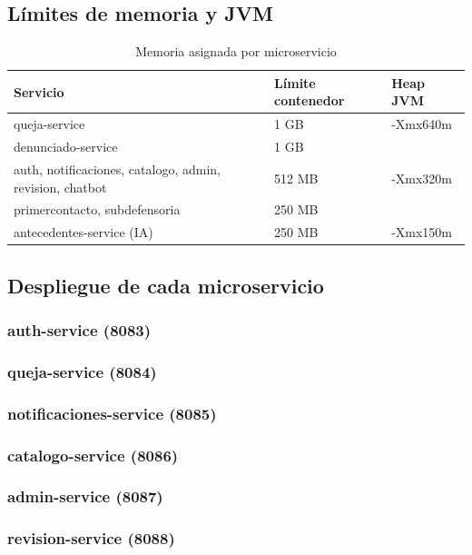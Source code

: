 \subsection{Límites de memoria y JVM}
\begin{table}[H]
\centering
\caption{Memoria asignada por microservicio}
\begin{tabular}{lll}
\toprule
\textbf{Servicio} & \textbf{Límite contenedor} & \textbf{Heap JVM} \\
\midrule
queja-service & 1 GB & -Xmx640m \\
denunciado-service & 1 GB & \pendiente{} \\
auth, notificaciones, catalogo, admin, revision, chatbot & 512 MB & -Xmx320m \\
primercontacto, subdefensoria & 250 MB & \pendiente{} \\
antecedentes-service (IA) & 250 MB & -Xmx150m \\
\bottomrule
\end{tabular}
\end{table}

\subsection{Despliegue de cada microservicio}
\subsubsection{auth-service (8083)}
\subsubsection{queja-service (8084)}
\subsubsection{notificaciones-service (8085)}
\subsubsection{catalogo-service (8086)}
\subsubsection{admin-service (8087)}
\subsubsection{revision-service (8088)}
